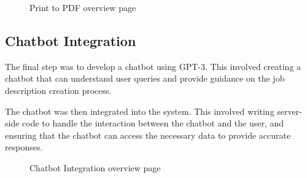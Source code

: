 \begin{figure}[H]
    \centering
    \caption{ Print to PDF overview page }
    \label{fig:Print-to-PDF-overview-page}
\end{figure}


\subsection{Chatbot Integration} 
The final step was to develop a chatbot using GPT-3. This involved creating a chatbot that can understand user queries and provide guidance on the job description creation process.

The chatbot was then integrated into the system. This involved writing server-side code to handle the interaction between the chatbot and the user, and ensuring that the chatbot can access the necessary data to provide accurate responses.




\begin{figure}[H]
    \centering
    \caption{ Chatbot Integration overview page}
    \label{fig:Chatbot-Integration-Vue2-overview-page}
\end{figure}


